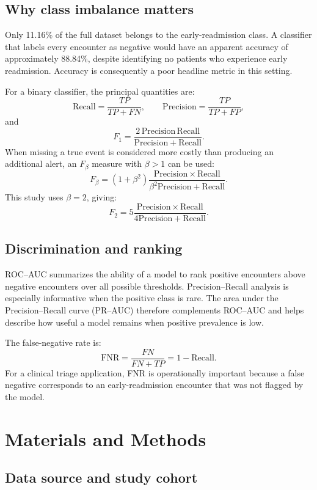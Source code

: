 \documentclass[10pt,a4paper]{article}
\newcommand{\prauc}{PR--AUC}
\begin{document}
\subsection{Why class imbalance matters}

Only 11.16\% of the full dataset belongs to the early-readmission class. A classifier that labels every encounter as negative would have an apparent accuracy of approximately 88.84\%, despite identifying no patients who experience early readmission. Accuracy is consequently a poor headline metric in this setting.

For a binary classifier, the principal quantities are:
\[
\mathrm{Recall} = \frac{TP}{TP+FN},
\qquad
\mathrm{Precision} = \frac{TP}{TP+FP},
\]
and
\[
F_1 = \frac{2\,\mathrm{Precision}\,\mathrm{Recall}}
{\mathrm{Precision}+\mathrm{Recall}}.
\]
When missing a true event is considered more costly than producing an additional alert, an $F_\beta$ measure with $\beta>1$ can be used:
\[
F_\beta=(1+\beta^2)
\frac{\mathrm{Precision}\times\mathrm{Recall}}
{\beta^2\mathrm{Precision}+\mathrm{Recall}}.
\]
This study uses $\beta=2$, giving:
\[
F_2=5\frac{\mathrm{Precision}\times\mathrm{Recall}}
{4\mathrm{Precision}+\mathrm{Recall}}.
\]

\subsection{Discrimination and ranking}

ROC--AUC summarizes the ability of a model to rank positive encounters above negative encounters over all possible thresholds. Precision--Recall analysis is especially informative when the positive class is rare. The area under the Precision--Recall curve (\prauc) therefore complements ROC--AUC and helps describe how useful a model remains when positive prevalence is low.

The false-negative rate is:
\[
\mathrm{FNR}=\frac{FN}{FN+TP}=1-\mathrm{Recall}.
\]
For a clinical triage application, FNR is operationally important because a false negative corresponds to an early-readmission encounter that was not flagged by the model.

\section{Materials and Methods}

\subsection{Data source and study cohort}
\end{document}
